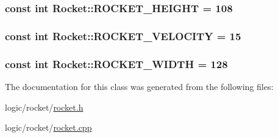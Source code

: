 \hypertarget{class_rocket_a5096c34316cb2b6116b3971f0cbb56f2}{
\subsubsection[{R\-O\-C\-K\-E\-T\-\_\-\-H\-E\-I\-G\-H\-T}]{\setlength{\rightskip}{0pt plus 5cm}const int Rocket\-::\-R\-O\-C\-K\-E\-T\-\_\-\-H\-E\-I\-G\-H\-T = 108\hspace{0.3cm}{\ttfamily [static]}}}\label{class_rocket_a5096c34316cb2b6116b3971f0cbb56f2}
\hypertarget{class_rocket_a1a590b76e2cc310e566f2624265f5c47}{
\subsubsection[{R\-O\-C\-K\-E\-T\-\_\-\-V\-E\-L\-O\-C\-I\-T\-Y}]{\setlength{\rightskip}{0pt plus 5cm}const int Rocket\-::\-R\-O\-C\-K\-E\-T\-\_\-\-V\-E\-L\-O\-C\-I\-T\-Y = 15\hspace{0.3cm}{\ttfamily [static]}}}\label{class_rocket_a1a590b76e2cc310e566f2624265f5c47}
\hypertarget{class_rocket_ac8b2266f7e3aa777aca1b0144722a0db}{
\subsubsection[{R\-O\-C\-K\-E\-T\-\_\-\-W\-I\-D\-T\-H}]{\setlength{\rightskip}{0pt plus 5cm}const int Rocket\-::\-R\-O\-C\-K\-E\-T\-\_\-\-W\-I\-D\-T\-H = 128\hspace{0.3cm}{\ttfamily [static]}}}\label{class_rocket_ac8b2266f7e3aa777aca1b0144722a0db}


The documentation for this class was generated from the following files\-:\begin{DoxyCompactItemize}
\item 
logic/rocket/\hyperlink{rocket_8h}{rocket.\-h}\item 
logic/rocket/\hyperlink{rocket_8cpp}{rocket.\-cpp}\end{DoxyCompactItemize}
